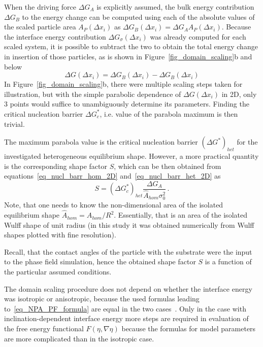 When the driving force $\Delta G_A$ is explicitly assumed, the bulk energy contribution $\Delta G_B$ to the energy change can be computed using each of the absolute values of the scaled particle area $A_P(\Delta x_i)$ as $\Delta G_B(\Delta x_i)=\Delta G_A A_P(\Delta x_i)$. Because the interface energy contribution $\Delta G_\sigma(\Delta x_i)$ was already computed for each scaled system, it is possible to subtract the two to obtain the total energy change in insertion of those particles, as is shown in Figure~\ref{fig_domain_scaling}b and below
\begin{equation}
	\Delta G(\Delta x_i) = \Delta G_B(\Delta x_i) - \Delta G_B(\Delta x_i)
\end{equation}
 In Figure~\ref{fig_domain_scaling}b, there were multiple scaling steps taken for illustration, but with the simple parabolic dependence of $\Delta G(\Delta x_i)$ in 2D, only 3 points would suffice to unambiguously determine its parameters. Finding the critical nucleation barrier $\Delta G^*_c$, i.e. value of the parabola maximum is then trivial. 

The maximum parabola value is the critical nucleation barrier $(\Delta G^*)_{het}$ for the investigated heterogeneous equilibrium shape. However, a more practical quantity is the corresponding shape factor $S$, which can be then obtained from equations~\eqref{eq_nucl_barr_hom_2D} and~\eqref{eq_nucl_barr_het_2D} as
\begin{equation} \label{eq_NPA_PF_formula}
	S = (\Delta G_c^*)_{het}\frac{\Delta G_A}{\hat{A}_{hom}\sigma_0^2} \,.
\end{equation}
Note, that one needs to know the non-dimensional area of the isolated equilibrium shape $\hat{A}_{hom}=A_{hom}/R^2$. Essentially, that is an area of the isolated Wulff shape of unit radius (in this study it was obtained numerically from Wulff shapes plotted with fine resolution).

Recall, that the contact angles of the particle with the substrate were the input to the phase field simulation, hence the obtained shape factor $S$ is a function of the particular assumed conditions. 

The domain scaling procedure does not depend on whether the interface energy was isotropic or anisotropic, because the used formulas leading to~\eqref{eq_NPA_PF_formula} are equal in the two cases~\cite{Mariaux2011}. Only in the case with inclination-dependent interface energy more steps are required in evaluation of the free energy functional $F(\eta,\nabla\eta)$ because the formulas for model parameters are more complicated than in the isotropic case.


